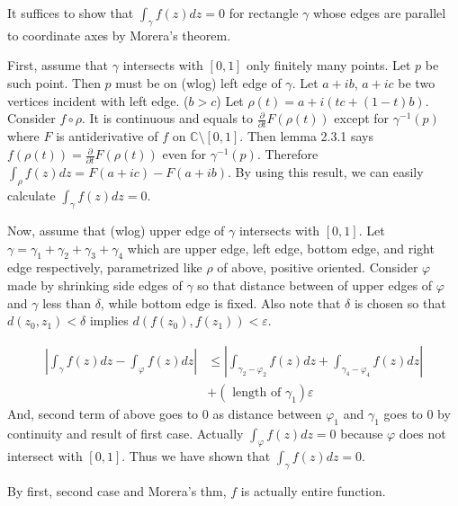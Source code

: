 \begin{problem}[3.1] \hfill

	It suffices to show that $\int_\gamma f(z) dz = 0$ for rectangle $\gamma$ whose edges are parallel to coordinate axes by Morera's theorem.

	First, assume that $\gamma$ intersects with $\left[ 0, 1 \right]$ only finitely many points. Let $p$ be such point. Then $p$ must be on (wlog) left edge of $\gamma$. Let $a + ib$, $a+ic$ be two vertices incident with left edge. ($b>c$) Let $\rho(t) = a + i(tc + (1-t)b)$. Consider $f \circ \rho$. It is continuous and equals to $\frac{\partial}{\partial t}F(\rho(t))$ except for $\gamma^{-1}(p)$ where $F$ is antiderivative of $f$ on $\mathbb{C} \setminus \left[ 0, 1 \right]$. 
	Then lemma 2.3.1 says $f(\rho(t)) = \frac{\partial}{\partial t}F(\rho(t))$ even for $\gamma^{-1}(p)$.
	Therefore $\int_\rho f(z) dz = F(a+ic) - F(a+ib)$. By using this result, we can easily calculate $\int_\gamma f(z) dz = 0$.

	Now, assume that (wlog) upper edge of $\gamma$ intersects with $\left[ 0, 1 \right]$. Let $\gamma = \gamma_1 + \gamma_2 + \gamma_3 + \gamma_4$ which are upper edge, left edge, bottom edge, and right edge respectively, parametrized like $\rho$ of above, positive oriented.
	Consider $\varphi$ made by shrinking side edges of $\gamma$ so that distance between of upper edges of $\varphi$ and $\gamma$ less than $\delta$, while bottom edge is fixed. Also note that $\delta$ is chosen so that $d(z_0, z_1) < \delta$ implies $d(f(z_0), f(z_1)) < \varepsilon$. 

	\begin{equation*}
		\begin{split}
			\left | \int_\gamma f(z) dz - \int_\varphi f(z)dz \right |
			& \leq \left | \int_{\gamma_2 - \varphi_2} f(z) dz + \int_{\gamma_4 - \varphi_4} f(z) dz \right |\\
			& +\left ( \text{ length of } \gamma_1 \right ) \varepsilon
		\end{split}
		\label{<+label+>}
	\end{equation*}
	And, second term of above goes to $0$ as distance between $\varphi_1$ and $\gamma_1$ goes to 0 by continuity and result of first case.
	Actually $\int_\varphi f(z) dz = 0$ because $\varphi$ does not intersect with $\left[ 0, 1 \right]$. Thus we have shown that $\int_\gamma f(z) dz = 0$.

	By first, second case and Morera's thm, $f$ is actually entire function.
\end{problem}

